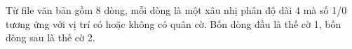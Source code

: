 Từ file văn bản gồm 8 dòng, mỗi dòng là một xâu nhị phân độ dài 4 mà số 1/0 tương ứng với vị trí có hoặc không có quân cờ. Bốn dòng đầu là thế cờ 1, bốn dòng sau là thế cờ 2.